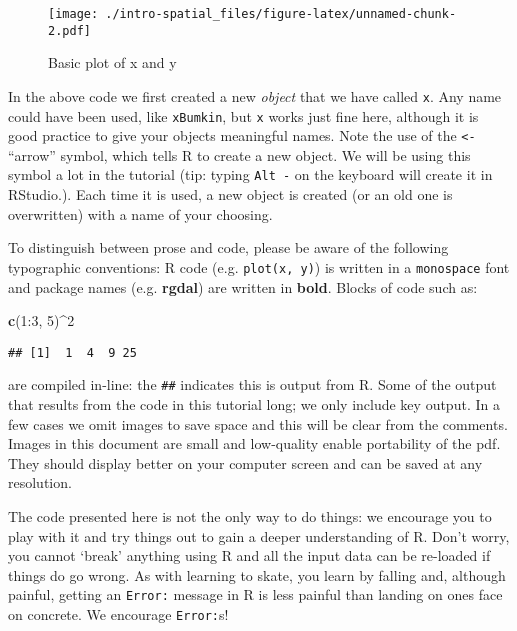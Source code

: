 \documentclass[]{article}
\newenvironment{Shaded}{}{}
\newcommand{\KeywordTok}[1]{\textcolor[rgb]{0.00,0.44,0.13}{\textbf{{#1}}}}
\newcommand{\DecValTok}[1]{\textcolor[rgb]{0.25,0.63,0.44}{{#1}}}
\newcommand{\NormalTok}[1]{{#1}}
\begin{document}
\begin{figure}[htbp]
\centering
\texttt{[image: ./intro-spatial\_files/figure-latex/unnamed-chunk-2.pdf]}
\caption{Basic plot of x and y}
\end{figure}

In the above code we first created a new \emph{object} that we have
called \texttt{x}. Any name could have been used, like \texttt{xBumkin},
but \texttt{x} works just fine here, although it is good practice to
give your objects meaningful names. Note the use of the
\texttt{\textless{}-} ``arrow'' symbol, which tells R to create a new
object. We will be using this symbol a lot in the tutorial (tip: typing
\texttt{Alt -} on the keyboard will create it in RStudio.). Each time it
is used, a new object is created (or an old one is overwritten) with a
name of your choosing.

To distinguish between prose and code, please be aware of the following
typographic conventions: R code (e.g. \texttt{plot(x, y)}) is written in
a \texttt{monospace} font and package names (e.g. \textbf{rgdal}) are
written in \textbf{bold}. Blocks of code such as:

\begin{Shaded}
\begin{Highlighting}[]
\KeywordTok{c}\NormalTok{(}\DecValTok{1}\NormalTok{:}\DecValTok{3}\NormalTok{, }\DecValTok{5}\NormalTok{)^}\DecValTok{2}
\end{Highlighting}
\end{Shaded}

\begin{verbatim}
## [1]  1  4  9 25
\end{verbatim}

are compiled in-line: the \texttt{\#\#} indicates this is output from R.
Some of the output that results from the code in this tutorial long; we
only include key output. In a few cases we omit images to save space and
this will be clear from the comments. Images in this document are small
and low-quality enable portability of the pdf. They should display
better on your computer screen and can be saved at any resolution.

The code presented here is not the only way to do things: we encourage
you to play with it and try things out to gain a deeper understanding of
R. Don't worry, you cannot `break' anything using R and all the input
data can be re-loaded if things do go wrong. As with learning to skate,
you learn by falling and, although painful, getting an \texttt{Error:}
message in R is less painful than landing on ones face on concrete. We
encourage \texttt{Error:}s!
\end{document}
